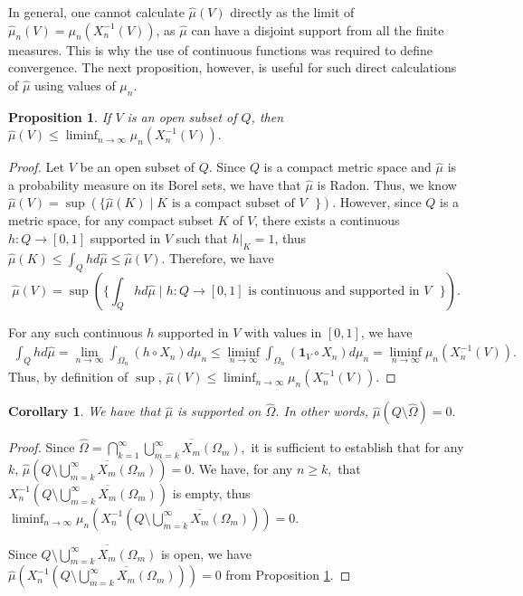 \documentclass[10pt,a4paper]{amsart}
\newtheorem{prop}[thm]{Proposition}
\newtheorem{cor}[thm]{Corollary}
\def \HOM{\hat{\Omega}}
\def \HMU{\hat{\mu}}
\begin{document}
In general, one cannot calculate $\HMU(V)$ directly as the limit of $\HMU_n(V)=\mu_n(X_n^{-1}(V))$, as $\HMU$ can have a disjoint support from all the finite measures. This is why the use of continuous functions was required to define convergence. The next proposition, however, is useful for such direct calculations of $\HMU$ using values of $\mu_n$.
\begin{prop}\label{proposition_open_measure}
	If $V$ is an open subset of $Q$, then $\HMU(V)\leq \liminf_{n\rightarrow\infty} \mu_n(X_n^{-1}(V)).$
\end{prop}
\begin{proof}
	Let $V$ be an open subset of $Q$. Since $Q$ is a compact metric space and $\HMU$ is a probability measure on its Borel sets, we have that $\HMU$ is Radon. Thus, we know $\HMU(V)=\sup(\{\HMU(K)\;|\; K \text{ is a compact subset of $V$ } \}).$ However, since $Q$ is a metric space, for any compact subset $K$ of $V$, there exists a continuous $h:Q\rightarrow [0,1]$ supported in $V$ such that $h|_K =1$, thus $\HMU(K)\leq \int_{Q} h d\HMU \leq \HMU(V).$ Therefore, we have $$\HMU(V)=\sup(\{\int_{Q}hd\HMU\;|\; h:Q\rightarrow[0,1] \text{ is continuous and supported in $V$ } \}).$$
	
	For any such continuous $h$ supported in $V$ with values in $[0,1]$, we have 
	\begin{align*}
		\int_{Q}hd\HMU=\lim_{n\rightarrow\infty}\int_{\Omega_n}(h\circ X_n)d\mu_n\leq\liminf_{n\rightarrow\infty}\int_{\Omega_n}(\mathbf{1}_V\circ X_n)d\mu_n=\liminf_{n\rightarrow\infty} \mu_n(X_n^{-1}(V)).
	\end{align*}
	Thus, by definition of $\sup$, $\HMU(V)\leq\liminf_{n\rightarrow\infty} \mu_n(X_n^{-1}(V)).$
\end{proof}
\begin{cor}\label{corollary_suport_limits}
	We have that $\HMU$ is supported on $\HOM$. In other words, $\HMU(Q\setminus\HOM)=0.$
\end{cor}
\begin{proof}
	Since $\HOM=\bigcap_{k=1}^\infty\overline{\bigcup_{m=k}^{\infty}X_m(\Omega_m)},$ it is sufficient to establish that for any $k$, $\HMU(Q\setminus\overline{\bigcup_{m=k}^{\infty}X_m(\Omega_m)})=0.$ We have, for any $n\geq k,$ that $X_n^{-1}\left(Q\setminus\overline{\bigcup_{m=k}^{\infty}X_m(\Omega_m)}\right)$ is empty, thus $\liminf_{n\rightarrow\infty} \mu_n\left(X_n^{-1}\left(Q\setminus\overline{\bigcup_{m=k}^{\infty}X_m(\Omega_m)}\right)\right)=0.$  
	
	Since $Q\setminus\overline{\bigcup_{m=k}^{\infty}X_m(\Omega_m)}$ is open, we have $\HMU\left(X_n^{-1}\left(Q\setminus\overline{\bigcup_{m=k}^{\infty}X_m(\Omega_m)}\right)\right)=0$ from Proposition \ref{proposition_open_measure}.
\end{proof}
\end{document}

